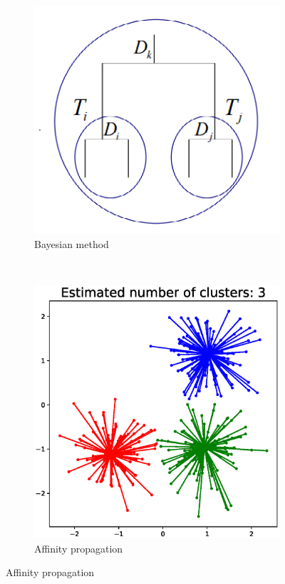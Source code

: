 \documentclass[notheorems]{beamer}
\begin{document}
\begin{frame}
\begin{figure}
\begin{subfigure}[b]{0.3\textwidth}
        \includegraphics[width=\textwidth]{pic/bayesian.png}
        \caption{Bayesian method}
    \end{subfigure}
    ~ %
    \begin{subfigure}[b]{0.3\textwidth}
        \includegraphics[width=\textwidth]{pic/affinity_propagation.eps}
        \caption{Affinity propagation}
    \end{subfigure}
\end{figure}
\end{frame}
\end{document}
